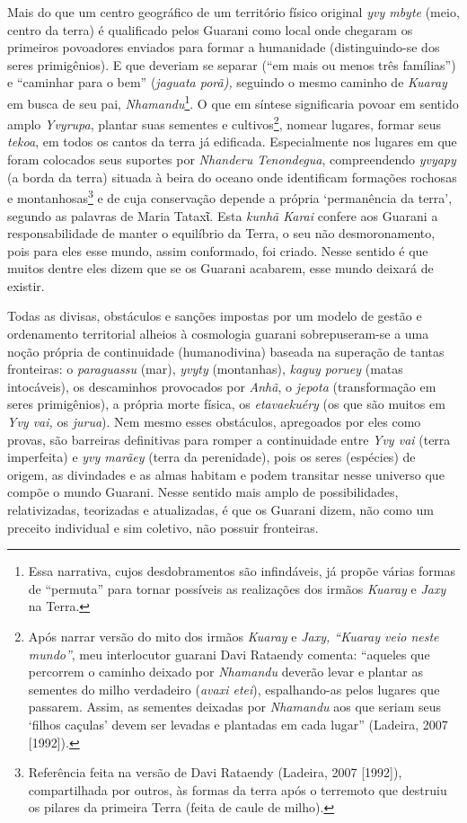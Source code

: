 Mais do que um centro geográfico de um território físico original
\emph{yvy mbyte} (meio, centro da terra) é qualificado pelos Guarani
como local onde chegaram os primeiros povoadores enviados para formar a
humanidade (distinguindo-se dos seres primigênios). E que deveriam se
separar (``em mais ou menos três famílias'') e ``caminhar para o bem''
(\emph{jaguata porã),} seguindo o mesmo caminho de \emph{Kuaray} em
busca de seu pai, \emph{Nhamandu}\footnote{Essa narrativa, cujos
  desdobramentos são infindáveis, já propõe várias formas de ``permuta''
  para tornar possíveis as realizações dos irmãos \emph{Kuaray} e
  \emph{Jaxy} na Terra.}. O que em síntese significaria povoar em
sentido amplo \emph{Yvyrupa}, plantar suas sementes e cultivos\footnote{Após
  narrar versão do mito dos irmãos \emph{Kuaray} e \emph{Jaxy, ``Kuaray
  veio neste mundo''}, meu interlocutor guarani Davi Rataendy comenta:
  ``aqueles que percorrem o caminho deixado por \emph{Nhamandu} deverão
  levar e plantar as sementes do milho verdadeiro (\emph{avaxi etei}),
  espalhando-as pelos lugares que passarem. Assim, as sementes deixadas
  por \emph{Nhamandu} aos que seriam seus `filhos caçulas' devem ser
  levadas e plantadas em cada lugar'' (Ladeira, 2007 {[}1992{]}).},
nomear lugares, formar seus \emph{tekoa}, em todos os cantos da terra já
edificada. Especialmente nos lugares em que foram colocados seus
suportes por \emph{Nhanderu Tenondegua}, compreendendo \emph{yvyapy} (a
borda da terra) situada à beira do oceano onde identificam formações
rochosas e montanhosas\footnote{Referência feita na versão de Davi
  Rataendy (Ladeira, 2007 {[}1992{]}), compartilhada por outros, às
  formas da terra após o terremoto que destruiu os pilares da primeira
  Terra (feita de caule de milho).} e de cuja conservação depende a
própria `permanência da terra', segundo as palavras de Maria Tataxῖ.
Esta \emph{kunhã Karai} confere aos Guarani a responsabilidade de manter
o equilíbrio da Terra, o seu não desmoronamento, pois para eles esse
mundo, assim conformado, foi criado. Nesse sentido é que muitos dentre
eles dizem que se os Guarani acabarem, esse mundo deixará de existir.

Todas as divisas, obstáculos e sanções impostas por um modelo de gestão
e ordenamento territorial alheios à cosmologia guarani sobrepuseram-se a
uma noção própria de continuidade (humanodivina) baseada na superação de
tantas fronteiras: o \emph{paraguassu} (mar), \emph{yvyty} (montanhas),
\emph{kaguy poruey} (matas intocáveis), os descaminhos provocados por
\emph{Anhã}, o \emph{jepota} (transformação em seres primigênios), a
própria morte física, os \emph{etavaekuéry} (os que são muitos em
\emph{Yvy vai,} os \emph{jurua}). Nem mesmo esses obstáculos, apregoados
por eles como provas, são barreiras definitivas para romper a
continuidade entre \emph{Yvy vai} (terra imperfeita) e \emph{yvy marãey}
(terra da perenidade), pois os seres (espécies) de origem, as divindades
e as almas habitam e podem transitar nesse universo que compõe o mundo
Guarani. Nesse sentido mais amplo de possibilidades, relativizadas,
teorizadas e atualizadas, é que os Guarani dizem, não como um preceito
individual e sim coletivo, não possuir fronteiras.

